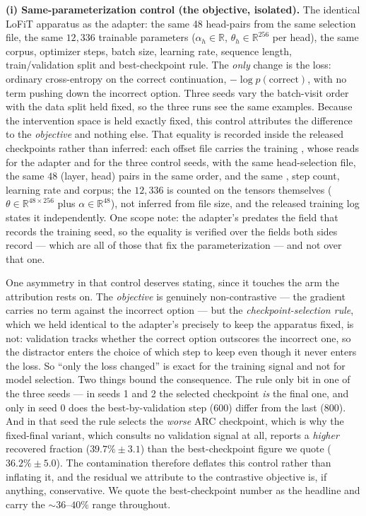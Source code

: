 \textbf{(i) Same-parameterization control (the objective, isolated).} The identical
LoFiT apparatus as the adapter: the same 48 head-pairs from the same selection file,
the same $12{,}336$ trainable parameters ($\alpha_h \in \mathbb{R}$,
$\theta_h \in \mathbb{R}^{256}$ per head), the same corpus, optimizer steps, batch
size, learning rate, sequence length, train/validation split and best-checkpoint
rule. The \emph{only} change is the loss: ordinary cross-entropy on the correct
continuation, $-\log p(\text{correct})$, with no term pushing down the incorrect
option. Three seeds vary the batch-visit order with the data split held fixed, so the
three runs see the same examples. Because the intervention space is held exactly
fixed, this control attributes the difference to the \emph{objective} and nothing
else. That equality is recorded inside the released checkpoints rather than inferred:
each offset file carries the training , whose  reads
 for the adapter and  for the three control seeds, with
the same head-selection file, the same $48$ (layer, head) pairs in the same order, and
the same , step count, learning rate and corpus; the $12{,}336$ is counted
on the tensors themselves ($\theta \in \mathbb{R}^{48 \times 256}$ plus
$\alpha \in \mathbb{R}^{48}$), not inferred from file size, and the released training
log states it independently. One scope note: the adapter's  predates the
field that records the training seed, so the equality is verified over the fields both
sides record --- which are all of those that fix the parameterization --- and not over
that one.

One asymmetry in that control deserves stating, since it touches the arm the
attribution rests on. The \emph{objective} is genuinely non-contrastive --- the
gradient carries no term against the incorrect option --- but the
\emph{checkpoint-selection rule}, which we held identical to the adapter's precisely
to keep the apparatus fixed, is not: validation tracks whether the correct option
outscores the incorrect one, so the distractor enters the choice of which step to
keep even though it never enters the loss. So ``only the loss changed'' is exact for
the training signal and not for model selection. Two things bound the consequence.
The rule only bit in one of the three seeds --- in seeds 1 and 2 the selected
checkpoint \emph{is} the final one, and only in seed 0 does the best-by-validation
step (600) differ from the last (800). And in that seed the rule selects the
\emph{worse} ARC checkpoint, which is why the fixed-final variant, which consults no
validation signal at all, reports a \emph{higher} recovered fraction
($39.7\% \pm 3.1$) than the best-checkpoint figure we quote ($36.2\% \pm 5.0$). The
contamination therefore deflates this control rather than inflating it, and the
residual we attribute to the contrastive objective is, if anything, conservative. We
quote the best-checkpoint number as the headline and carry the ${\sim}36$--$40\%$
range throughout.

